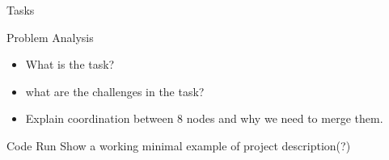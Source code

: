 \begin{frame}{Tasks}
	\begin{alertblock}{Problem Analysis}
	\begin{itemize}
	\item What is the task?
    \item what are the challenges in the task?
    \item Explain coordination between 8 nodes and why we need to merge them.
	\end{itemize}
    \end{alertblock}
    
    \begin{alertblock}{Code Run}
    Show a working minimal example of project description(?)
    \end{alertblock}
\end{frame}

